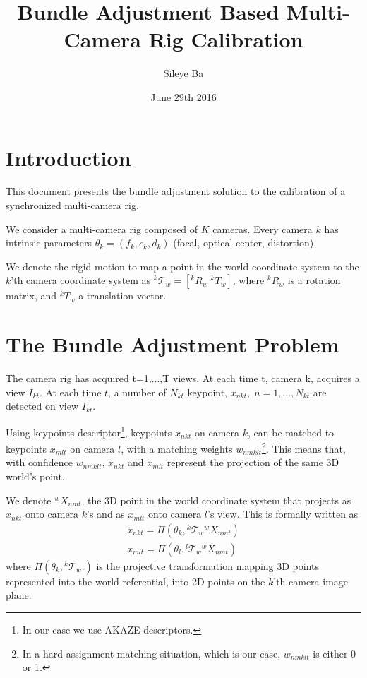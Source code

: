 \documentclass{article}
\begin{document}
\title{Bundle Adjustment Based Multi-Camera Rig Calibration}

\author{Sileye Ba}

\date{June 29th 2016}

\maketitle

\section{Introduction}

This document presents the bundle adjustment solution to the calibration of a synchronized multi-camera rig.

We consider a multi-camera rig composed of $K$ cameras. Every camera $k$ has intrinsic parameters $\theta_k = (f_k,c_k,d_k)$ (focal, optical center, distortion). 

We denote the rigid motion to map a point in the world coordinate system to the $k$'th camera coordinate system as ${}^k\mathcal{T}_w =[{}^kR_w\;{}^kT_w]$, where ${}^kR_w$ is a rotation matrix, and ${}^kT_w$ a translation vector.

\section{The Bundle Adjustment Problem}
The camera rig has acquired t=1,...,T views. At each time t, camera k, acquires a view $I_{kt}$. 
%
At each time $t$, a number of $N_{kt}$ keypoint, $x_{nkt},\; n=1,..., N_{kt}$ are detected on view $I_{kt}$.

Using keypoints descriptor\footnote{In our case we use AKAZE descriptors.}, keypoints $x_{nkt}$ on camera $k$, can be matched to keypoints $x_{mlt}$ on camera $l$, with a  matching weights $w_{nmklt}$\footnote{In a hard assignment matching situation, which is our case,  $w_{nmklt}$ is either 0 or 1.}. This means that, with confidence $w_{nmklt}$,  $x_{nkt}$ and $x_{mlt}$ represent the projection of the same 3D world's point.

We denote ${}^w X_{nmt}$, the 3D point in the world coordinate system that projects as  $x_{nkt}$ onto camera $k$'s and as  $x_{mlt}$ onto camera $l$'s view. This is formally written as  
\begin{align}\label{eq:direct-projection}
x_{nkt} = \Pi(\theta_k, {}^k\mathcal{T}_w {}^wX_{nmt}) \\ \nonumber
x_{mlt} = \Pi(\theta_l, {}^l\mathcal{T}_w {}^wX_{nmt})
\end{align}
where $\Pi(\theta_k,{}^k\mathcal{T}_w .)$ is the projective transformation mapping 3D points represented into the world referential, into 2D points on the $k$'th camera image plane.
\end{document}
